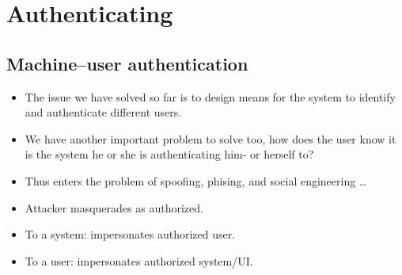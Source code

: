 \begin{frame}
  \titlepage{}
\end{frame}





\section{Authenticating}

\subsection{Machine--user authentication}

\begin{frame}
  \begin{remark}
    \begin{itemize}
      \item The issue we have solved so far is to design means for the system to 
        identify and authenticate different users.

      \item We have another important problem to solve too, how does the user 
        know it is the system he or she is authenticating him- or herself to?

      \item Thus enters the problem of spoofing, phising, and social engineering 
        \dots
    \end{itemize}
  \end{remark}
\end{frame}

\begin{frame}
  \begin{definition}
    \begin{itemize}
      \item Attacker masquerades as authorized.
      \item To a system: impersonates authorized user.
      \item To a user: impersonates authorized system/UI.
    \end{itemize}
  \end{definition}
\end{frame}


